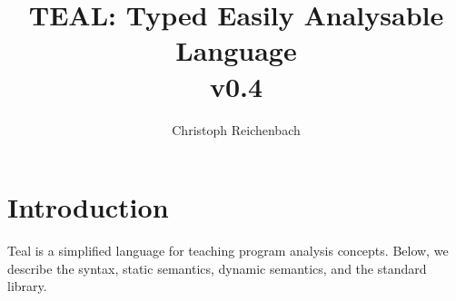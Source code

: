 \documentclass{article}
\title{TEAL: Typed Easily Analysable Language\\
  \normalsize v0.4}
\author{Christoph Reichenbach}
\newenvironment{TEALone}[1]{\begin{TEALoneBOX}#1}{\end{TEALoneBOX}}
\newenvironment{TEALtwo}[1]{\begin{TEALtwoBOX}#1}{\end{TEALtwoBOX}}
\newenvironment{TEALthree}[1]{\begin{TEALthreeBOX}#1}{\end{TEALthreeBOX}}
\begin{document}
\maketitle

\section{Introduction}

Teal is a simplified language for teaching program analysis concepts.
Below, we describe the syntax, static semantics, dynamic semantics,
and the standard library.








\end{document}
